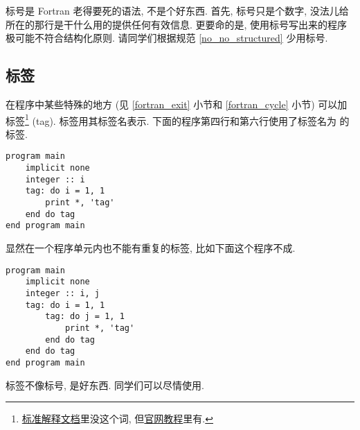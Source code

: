标号是 Fortran 老得要死的语法, 不是个好东西. 首先, 标号只是个数字, 没法儿给所在的那行是干什么用的提供任何有效信息. 更要命的是, 使用标号写出来的程序极可能不符合结构化原则. 请同学们根据规范 \ref{no_no_structured} 少用标号.

\subsection{标签}

在程序中某些特殊的地方 (见 \ref{fortran_exit} 小节和 \ref{fortran_cycle} 小节) 可以加标签\footnote{\href{https://j3-fortran.org/doc/year/24/24-007.pdf}{标准解释文档}里没这个词, 但\href{https://fortran-lang.org/learn/quickstart/}{官网教程}里有.} (tag). 标签用其标签名表示. 下面的程序第四行和第六行使用了标签名为  的标签.
\begin{lstlisting}
program main
    implicit none
    integer :: i
    tag: do i = 1, 1
        print *, 'tag'
    end do tag
end program main
\end{lstlisting}

显然在一个程序单元内也不能有重复的标签, 比如下面这个程序不成.
\begin{lstlisting}
program main
    implicit none
    integer :: i, j
    tag: do i = 1, 1
        tag: do j = 1, 1
            print *, 'tag'
        end do tag
    end do tag
end program main
\end{lstlisting}

标签不像标号, 是好东西. 同学们可以尽情使用.
